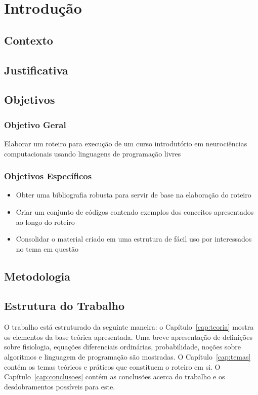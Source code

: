 \chapter{Introdução}\label{cap:introducao}
\section{Contexto}

\section{Justificativa}

\section{Objetivos}
\subsection{Objetivo Geral}
Elaborar um roteiro para execução de um curso introdutório em neurociências computacionais usando linguagens de programação livres

\subsection{Objetivos Específicos}
\begin{itemize}
\item Obter uma bibliografia robusta para servir de base na elaboração do roteiro
\item Criar um conjunto de códigos contendo exemplos dos conceitos apresentados ao longo do roteiro
\item Consolidar o material criado em uma estrutura de fácil uso por interessados no tema em questão
\end{itemize}

\section{Metodologia}

\section{Estrutura do Trabalho}
O trabalho está estruturado da seguinte maneira: o Capítulo~\ref{cap:teoria} mostra os elementos da base teórica apresentada. Uma breve apresentação de definições sobre fisiologia, equações diferenciais ordinárias, probabilidade, noções sobre algoritmos e linguagem de programação são mostradas. O Capítulo~\ref{cap:temas} contém os temas teóricos e práticos que constituem o roteiro em si. O Capítulo~\ref{cap:conclusoes} contém as conclusões acerca do trabalho e os desdobramentos possíveis para este.
